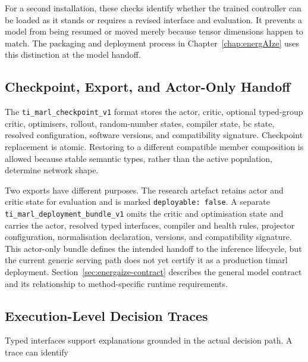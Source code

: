 For a second installation, these checks identify whether the trained controller can be loaded as it stands or requires a revised interface and evaluation. It prevents a model from being resumed or moved merely because tensor dimensions happen to match. The packaging and deployment process in Chapter~\ref{chap:energAIze} uses this distinction at the model handoff.

\subsection{Checkpoint, Export, and Actor-Only Handoff}
\label{sec:timarl-persistence}

The \texttt{ti\_marl\_checkpoint\_v1} format stores the actor, critic, optional typed-group critic, optimisers, rollout, random-number states, compiler state, \gls{bc} state, resolved configuration, software versions, and compatibility signature. Checkpoint replacement is atomic. Restoring to a different compatible member composition is allowed because stable semantic types, rather than the active population, determine network shape.

Two exports have different purposes. The research artefact retains actor and critic state for evaluation and is marked \texttt{deployable: false}. A separate \texttt{ti\_marl\_deployment\_bundle\_v1} omits the critic and optimisation state and carries the actor, resolved typed interfaces, compiler and health rules, projector configuration, normalisation declaration, versions, and compatibility signature. This actor-only bundle defines the intended handoff to the inference lifecycle, but the current generic serving path does not yet certify it as a production \gls{timarl} deployment. Section~\ref{sec:energaize-contract} describes the general model contract and its relationship to method-specific runtime requirements.

\subsection{Execution-Level Decision Traces}
\label{sec:timarl-explainability}

Typed interfaces support explanations grounded in the actual decision path. A trace can identify

